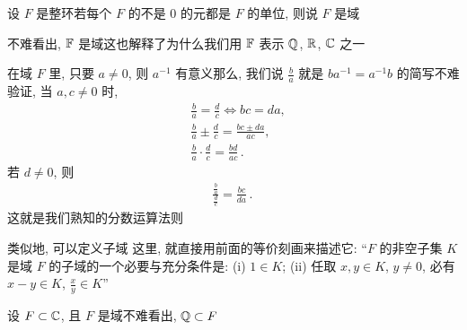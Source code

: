 \begin{definition}
    设 $F$ 是整环\period 若每个 $F$ 的不是 $0$ 的元都是 $F$ 的单位, 则说 $F$ 是域 \period
\end{definition}

\begin{example}
    不难看出, $\mathbb{F}$ 是域\period 这也解释了为什么我们用 $\mathbb{F}$ 表示 $\mathbb{Q}$, $\mathbb{R}$, $\mathbb{C}$ 之一\period
\end{example}

\begin{remark}
    在域 $F$ 里, 只要 $a \neq 0$, 则 $a^{-1}$ 有意义\period 那么, 我们说 $\frac{b}{a}$ 就是 $ba^{-1} = a^{-1}b$ 的简写\period 不难验证, 当 $a,c \neq 0$ 时,
    \begin{align*}
         & \frac{b}{a} = \frac{d}{c} \iff bc = da,              \\
         & \frac{b}{a} \pm \frac{d}{c} = \frac{bc \pm da}{ac},  \\
         & \frac{b}{a} \cdot \frac{d}{c} = \frac{bd}{ac}\period
    \end{align*}
    若 $d \neq 0$, 则
    \begin{align*}
        \frac{\frac{b}{a}}{\frac{d}{c}} = \frac{bc}{da}\period
    \end{align*}
    这就是我们熟知的分数运算法则\period
\end{remark}

\begin{remark}
    类似地, 可以定义子域 \period 这里, 就直接用前面的等价刻画来描述它: ``$F$ 的非空子集 $K$ 是域 $F$ 的子域的一个必要与充分条件是: (i) $1 \in K$; (ii) 任取 $x,y \in K$, $y \neq 0$, 必有 $x-y \in K$, $\frac{x}{y} \in K$\period ''
\end{remark}

\begin{example}
    设 $F \subset \mathbb{C}$, 且 $F$ 是域\period 不难看出, $\mathbb{Q} \subset F$\period
\end{example}
